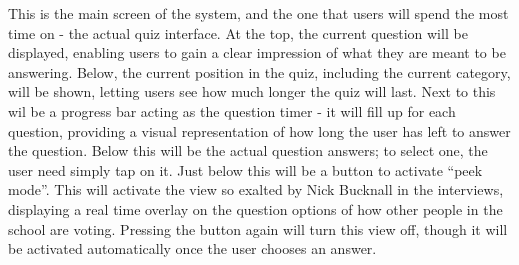 This is the main screen of the system, and the one that users will spend the most time on - the actual quiz interface. At the top, the current question will be displayed, enabling users to gain a clear impression of what they are meant to be answering. Below, the current position in the quiz, including the current category, will be shown, letting users see how much longer the quiz will last. Next to this wil be a progress bar acting as the question timer - it will fill up for each question, providing a visual representation of how long the user has left to answer the question. Below this will be the actual question answers; to select one, the user need simply tap on it. Just below this will be a button to activate ``peek mode''. This will activate the view so exalted by Nick Bucknall in the interviews, displaying a real time overlay on the question options of how other people in the school are voting. Pressing the button again will turn this view off, though it will be activated automatically once the user chooses an answer.
